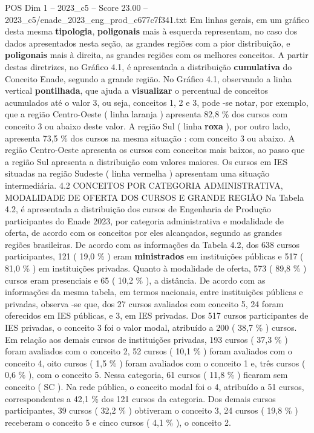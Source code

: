 \begin{textsample}{POS Dim 1 – 2023\_c5 – Score 23.00 – 2023\_c5/enade\_2023\_eng\_prod\_c677c7f341.txt}
Em linhas gerais, em um gráfico desta mesma \textbf{tipologia}, \textbf{poligonais} mais à esquerda representam, no caso dos dados apresentados nesta seção, as grandes regiões com a pior distribuição, e \textbf{poligonais} mais à direita, as grandes regiões com os melhores conceitos.
A partir destas diretrizes, no Gráfico 4.1, é apresentada a distribuição \textbf{cumulativa} do Conceito Enade, segundo a grande região.
No Gráfico 4.1, observando a linha vertical \textbf{pontilhada}, que ajuda a \textbf{visualizar} o percentual de conceitos acumulados até o valor 3, ou seja, conceitos 1, 2 e 3, pode -se notar, por exemplo, que a região Centro-Oeste ( linha laranja ) apresenta 82,8 \% dos cursos com conceito 3 ou abaixo deste valor.
A região Sul ( linha \textbf{roxa} ), por outro lado, apresenta 73,5 \% dos cursos na mesma situação : com conceito 3 ou abaixo.
A região Centro-Oeste apresenta os cursos com conceitos mais baixos, ao passo que a região Sul apresenta a distribuição com valores maiores.
Os cursos em IES situadas na região Sudeste ( linha vermelha ) apresentam uma situação intermediária. 4.2 CONCEITOS POR CATEGORIA ADMINISTRATIVA, MODALIDADE DE OFERTA DOS CURSOS E GRANDE REGIÃO Na Tabela 4.2, é apresentada a distribuição dos cursos de Engenharia de Produção participantes do Enade 2023, por categoria administrativa e modalidade de oferta, de acordo com os conceitos por eles alcançados, segundo as grandes regiões brasileiras.
De acordo com as informações da Tabela 4.2, dos 638 cursos participantes, 121 ( 19,0 \% ) eram \textbf{ministrados} em instituições públicas e 517 ( 81,0 \% ) em instituições privadas.
Quanto à modalidade de oferta, 573 ( 89,8 \% ) cursos eram presenciais e 65 ( 10,2 \% ), a distância.
De acordo com as informações da mesma tabela, em termos nacionais, entre instituições públicas e privadas, observa -se que, dos 27 cursos avaliados com conceito 5, 24 foram oferecidos em IES públicas, e 3, em IES privadas.
Dos 517 cursos participantes de IES privadas, o conceito 3 foi o valor modal, atribuído a 200 ( 38,7 \% ) cursos.
Em relação aos demais cursos de instituições privadas, 193 cursos ( 37,3 \% ) foram avaliados com o conceito 2, 52 cursos ( 10,1 \% ) foram avaliados com o conceito 4, oito cursos ( 1,5 \% ) foram avaliados com o conceito 1 e, três cursos ( 0,6 \% ), com o conceito 5.
Nessa categoria, 61 cursos ( 11,8 \% ) ficaram sem conceito ( SC ).
Na rede pública, o conceito modal foi o 4, atribuído a 51 cursos, correspondentes a 42,1 \% dos 121 cursos da categoria.
Dos demais cursos participantes, 39 cursos ( 32,2 \% ) obtiveram o conceito 3, 24 cursos ( 19,8 \% ) receberam o conceito 5 e cinco cursos ( 4,1 \% ), o conceito 2.

\end{textsample}

